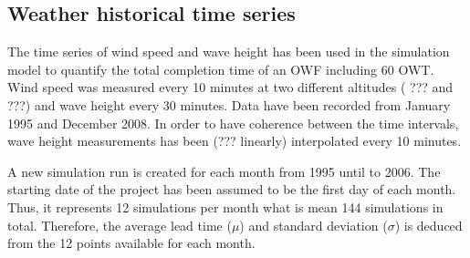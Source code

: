 \subsection{Weather historical time series}
The time series of wind speed and wave height has been used in the simulation model to quantify the total completion time of an OWF including 60 OWT. Wind speed was measured every 10 minutes at two different altitudes ( ??? and ???) and wave height every 30 minutes. Data have been recorded from January 1995 and December 2008. In order to have coherence between the time intervals, wave height measurements has been (??? linearly) interpolated every 10 minutes.

A new simulation run is created for each month from 1995 until to 2006. The starting date of the project has been assumed to be the first day of each month. Thus, it represents 12 simulations per month what is mean 144 simulations in total. Therefore, the average lead time ($\mu$) and standard deviation ($\sigma$) is deduced from the 12 points available for each month.